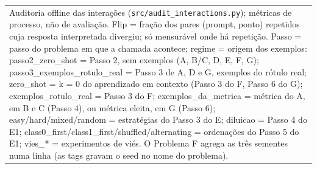 \begin{table}[htbp]
\begin{tabular}{lllrrrrrr}
\bottomrule
\multicolumn{9}{p{0.95\linewidth}}{\footnotesize Auditoria offline das interações (\texttt{src/audit\_interactions.py}); métricas de processo, não de avaliação. Flip = fração dos pares (prompt, ponto) repetidos cuja resposta interpretada divergiu; só mensurável onde há repetição. Passo = passo do problema em que a chamada acontece; regime = origem dos exemplos: passo2\_zero\_shot = Passo 2, sem exemplos (A, B/C, D, E, F, G); passo3\_exemplos\_rotulo\_real = Passo 3 de A, D e G, exemplos do rótulo real; zero\_shot = k = 0 do aprendizado em contexto (Passo 3 do F, Passo 6 do G); exemplos\_rotulo\_real = Passo 3 do F; exemplos\_da\_metrica = métrica do A, em B e C (Passo 4), ou métrica eleita, em G (Passo 6); easy/hard/mixed/random = estratégias do Passo 3 do E; diluicao = Passo 4 do E1; class0\_first/class1\_first/shuffled/alternating = ordenações do Passo 5 do E1; vies\_* = experimentos de viés. O Problema F agrega as três sementes numa linha (as tags gravam o seed no nome do problema).} \\
\end{tabular}
\end{table}

